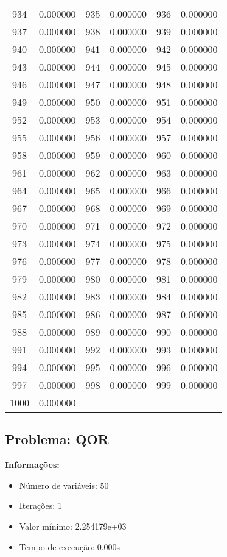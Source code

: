 \documentclass[12pt]{article}
\begin{document}
\begin{longtable}{@{}cc|cc|cc@{}}
934 & 0.000000 & 935 & 0.000000 & 936 & 0.000000 \\
937 & 0.000000 & 938 & 0.000000 & 939 & 0.000000 \\
940 & 0.000000 & 941 & 0.000000 & 942 & 0.000000 \\
943 & 0.000000 & 944 & 0.000000 & 945 & 0.000000 \\
946 & 0.000000 & 947 & 0.000000 & 948 & 0.000000 \\
949 & 0.000000 & 950 & 0.000000 & 951 & 0.000000 \\
952 & 0.000000 & 953 & 0.000000 & 954 & 0.000000 \\
955 & 0.000000 & 956 & 0.000000 & 957 & 0.000000 \\
958 & 0.000000 & 959 & 0.000000 & 960 & 0.000000 \\
961 & 0.000000 & 962 & 0.000000 & 963 & 0.000000 \\
964 & 0.000000 & 965 & 0.000000 & 966 & 0.000000 \\
967 & 0.000000 & 968 & 0.000000 & 969 & 0.000000 \\
970 & 0.000000 & 971 & 0.000000 & 972 & 0.000000 \\
973 & 0.000000 & 974 & 0.000000 & 975 & 0.000000 \\
976 & 0.000000 & 977 & 0.000000 & 978 & 0.000000 \\
979 & 0.000000 & 980 & 0.000000 & 981 & 0.000000 \\
982 & 0.000000 & 983 & 0.000000 & 984 & 0.000000 \\
985 & 0.000000 & 986 & 0.000000 & 987 & 0.000000 \\
988 & 0.000000 & 989 & 0.000000 & 990 & 0.000000 \\
991 & 0.000000 & 992 & 0.000000 & 993 & 0.000000 \\
994 & 0.000000 & 995 & 0.000000 & 996 & 0.000000 \\
997 & 0.000000 & 998 & 0.000000 & 999 & 0.000000 \\
1000 & 0.000000 &  &  &  &  \\

\end{longtable}


\newpage            
\subsection{Problema: QOR}

\textbf{Informações:}
\begin{itemize}
\item Número de variáveis: 50
\item Iterações: 1
\item Valor mínimo: 2.254179e+03
\item Tempo de execução: 0.000s
\end{itemize}
\end{document}
